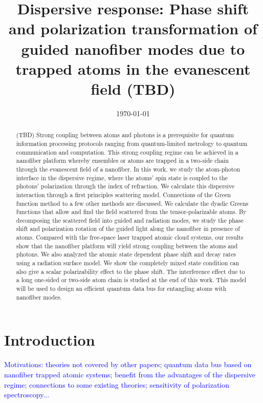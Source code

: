 \documentclass[preprint,aps,pra,onecolumn]{revtex4-1} %
\begin{document}
\title{Dispersive response: Phase shift and polarization transformation of guided nanofiber modes due to trapped atoms in the evanescent field (TBD)}
\author{}
\date{\today}


\begin{abstract}
(TBD) Strong coupling between atoms and photons is a prerequisite for quantum information processing protocols ranging from quantum-limited metrology to quantum communication and computation.  This strong coupling regime can be achieved in a nanofiber platform whereby ensembles or atoms are trapped in a two-side chain through the evanescent field of a nanofiber.  In this work, we study the atom-photon interface in the dispersive regime, where the atoms' spin state is coupled to the photons' polarization through the index of refraction. We calculate this dispersive interaction through a first principles scattering model. Connections of the Green function method to a few other methods are discussed.  We calculate the dyadic Greens functions that allow and find the field scattered from the tensor-polarizable atoms. By decomposing the scattered field into guided and radiation modes, we study the phase shift and polarization rotation of the guided light along the nanofiber in presence of atoms. Compared with the free-space laser trapped atomic cloud systems, our results show that the nanofiber platform will yield strong coupling between the atoms and photons. We also analyzed the atomic state dependent phase shift and decay rates using a radiation surface model. We show the completely mixed state condition can also give a scalar polarizability effect to the phase shift. The interference effect due to a long one-sided or two-side atom chain is studied at the end of this work. This model will be used to design an efficient quantum data bus for entangling atoms with nanofiber modes.   
\end{abstract}

\maketitle

\section{Introduction}

\bigskip
\textcolor{blue}{Motivations: theories not covered by other papers; quantum data bus based on nanofiber trapped atomic systems; benefit from the advantages of the dispersive regime; connections to some existing theories; sensitivity of polarization spectroscopy...}
\end{document}
